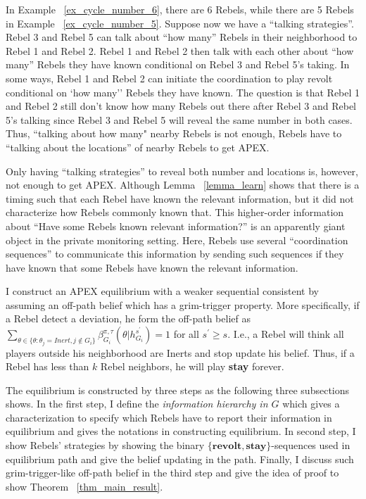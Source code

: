 \documentclass[12pt,letter]{article}
\theoremstyle{definition}
\theoremstyle{remark}
\theoremstyle{claim}
\begin{document}
In Example ~\ref{ex_cycle_number_6}, there are 6 Rebels, while there are 5 Rebels in Example ~\ref{ex_cycle_number_5}. Suppose now we have a ``talking strategies''. Rebel 3 and Rebel 5 can talk about ``how many'' Rebels in their neighborhood to Rebel 1 and Rebel 2. Rebel 1 and Rebel 2 then talk with each other about ``how many'' Rebels they have known conditional on Rebel 3 and Rebel 5's taking. In some ways, Rebel 1 and Rebel 2 can initiate the coordination to play revolt conditional on `how many'' Rebels they have known. The question is that Rebel 1 and Rebel 2 still don't know how many Rebels out there after Rebel 3 and Rebel 5's talking since Rebel 3 and Rebel 5 will reveal the same number in both cases. Thus, ``talking about how many" nearby Rebels is not enough, Rebels have to ``talking about the locations'' of nearby Rebels to get APEX. 

Only having ``talking strategies'' to reveal both number and locations is, however, not enough to get APEX. Although Lemma ~\ref{lemma_learn} shows that there is a timing such that each Rebel have known the relevant information, but it did not characterize how Rebels commonly known that. This higher-order information about ``Have some Rebels known relevant information?'' is an apparently giant object in the private monitoring setting. Here, Rebels use several ``coordination sequences'' to communicate this information by sending such sequences if they have known that some Rebels have known the relevant information.

I construct an APEX equilibrium with a weaker sequential consistent by assuming an off-path belief which has a grim-trigger property. More specifically, if a Rebel detect a deviation, he form the off-path belief as $\sum_{\theta \in \{\theta:\theta_j=Inert,j\notin G_i\}}\beta^{\pi,\tau}_{G_i}({\theta}|h^{s^{'}}_{G_i})=1$ for all $s^{'}\geq s$. I.e., a Rebel will think all players outside his neighborhood are Inerts and stop update his belief. Thus, if a Rebel has less than $k$ Rebel neighbors, he will play \textbf{stay} forever. 

The equilibrium is constructed by three steps as the following three subsections shows. In the first step, I define the \textit{information hierarchy in $G$} which gives a characterization to specify which Rebels have to report their information in equilibrium and gives the notations in constructing equilibrium. In second step, I show Rebels' strategies by showing the binary $\{\textbf{revolt},\textbf{stay}\}$-sequences used in equilibrium path and give the belief updating in the path. Finally, I discuss such grim-trigger-like off-path belief in the third step and give the idea of proof to show Theorem ~\ref{thm_main_result}. 
\end{document}
